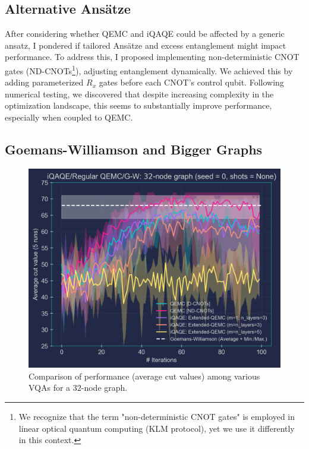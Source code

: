 \subsection{Alternative Ansätze}
\label{subsection:Alternative_Ansätze}
After considering whether QEMC and iQAQE could be affected by a generic ansatz, I pondered if tailored Ansätze and excess entanglement might impact performance. To address this, I proposed implementing non-deterministic CNOT gates (ND-CNOTs\footnote{We recognize that the term "non-deterministic CNOT gates" is employed in linear optical quantum computing (KLM protocol), yet we use it differently in this context.}), adjusting entanglement dynamically. We achieved this by adding parameterized $R_x$ gates before each CNOT's control qubit. Following numerical testing, we discovered that despite increasing complexity in the optimization landscape, this seems to substantially improve performance, especially when coupled to QEMC.

\subsection{Goemans-Williamson and Bigger Graphs}
\label{subsection:GW_Bigger_Graphs}

\begin{figure}[H]
    \centering
    \includegraphics[width=0.95\columnwidth]{Figures/Large graphs/32-node_Graph_seed=0.png}
    \caption{Comparison of performance (average cut values) among various VQAs for a $32$-node graph.}
    \label{fig:32-node_Graph}
\end{figure}

